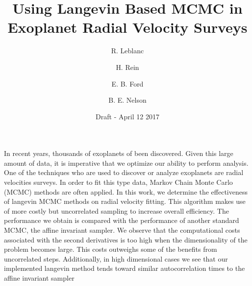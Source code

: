 \documentclass{aa}
\begin{document}
 


   \title{Using Langevin Based MCMC in Exoplanet Radial Velocity Surveys}

   \author{R. Leblanc
          \and
          H. Rein
          \and 
          E. B. Ford
          \and 
          B. E. Nelson
          }


   \date{Draft - April 12 2017}

 
  \abstract
   {In recent years, thousands of exoplanets of been discovered. Given this large amount of data, it is imperative that we optimize our ability to perform analysis. One of the techniques who are used to discover or analyze exoplanets are radial velocities surveys. In order to fit this type data, Markov Chain Monte Carlo (MCMC) methods are often applied.}
   {In this work, we determine the effectiveness of langevin MCMC methods on radial velocity fitting. This algorithm makes use of more costly but uncorrelated sampling to increase overall efficiency.}
   {The performance we obtain is compared with the performance of another standard MCMC, the affine invariant sampler.}
   {We observe that the computational costs associated with the second derivatives is too high when the dimensionality of the problem becomes large. This costs outweighs some of the benefits from uncorrelated steps. Additionally, in high dimensional cases we see that our implemented langevin method tends toward similar autocorrelation times to the affine invariant sampler}
   {}
\end{document}
